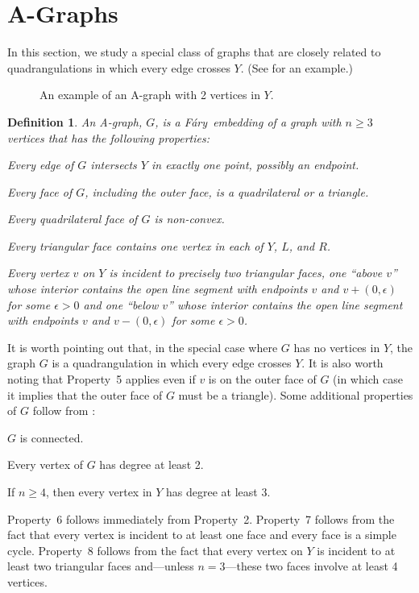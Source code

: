 \documentclass{patmorin}
\newtheorem{definition}{Definition}
\newcommand{\Fary}{Fáry}
\begin{document}
\section{A-Graphs}

In this section, we study a special class of graphs that are closely
related to quadrangulations in which every edge crosses $Y$. (See  for an example.)

\begin{figure}
   \caption{An example of an A-graph with 2 vertices in $Y$.}
\end{figure}

\begin{definition}
  An \emph{A-graph}, $G$, is a \Fary\ embedding of a graph with $n\ge 3$ vertices that has the following properties:
  \begin{compactenum}
   \item Every edge of $G$ intersects $Y$ in exactly one point, possibly an endpoint.
   \item Every face of $G$, including the outer face, is a quadrilateral or a triangle.
   \item Every quadrilateral face of $G$ is non-convex.
   \item Every triangular face contains one vertex in each of $Y$, $L$,
   and $R$.  
   \item Every vertex $v$ on $Y$ is incident to precisely
   two triangular faces, one ``above $v$'' whose interior contains the open line segment with endpoints $v$ and $v+(0,\epsilon)$ for some $\epsilon>0$ and one ``below $v$'' whose interior contains the open line segment with endpoints $v$ and $v-(0,\epsilon)$ for some $\epsilon >0$.
  \end{compactenum}
\end{definition}
It is worth pointing out that, in the special case where $G$ has no vertices in $Y$, the graph $G$ is a quadrangulation in which every edge crosses $Y$.
It is also worth noting that Property~5 applies even if $v$ is on the outer face of $G$ (in which case it implies that the outer face of $G$ must be a triangle).
Some additional properties of $G$ follow from :
\begin{compactenum}\setcounter{enumi}{5}
  \item $G$ is connected.
  \item Every vertex of $G$ has degree at least 2.   
  \item If $n\ge 4$, then every vertex in $Y$ has degree at least 3. 
\end{compactenum}
Property~6 follows immediately from Property~2.
Property~7 follows from the fact that every vertex is incident to at
least one face and every face is a simple cycle.
Property~8 follows from the fact that every vertex on $Y$ is incident
to at least two triangular faces and---unless $n=3$---these two faces
involve at least 4 vertices.
\end{document}
